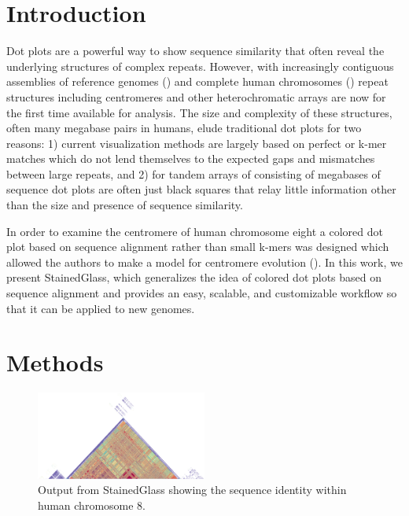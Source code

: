 \documentclass[nocrop]{bioinfo}
\begin{document}
\section{Introduction}
Dot plots are a powerful way to show sequence similarity that often reveal the
underlying structures of complex repeats. However, with increasingly contiguous
assemblies of reference genomes (\citealp{Rhie2021-zg}) and complete human
chromosomes (\citealp{Miga2020-pj,Logsdon2021-zr,Nurk2021-wb}) repeat structures
including centromeres and other heterochromatic arrays are now for the first
time available for analysis. The size and complexity of these structures, often
many megabase pairs in humans, elude traditional dot plots for two reasons: 1)
current visualization methods are largely based on perfect or k-mer matches
which do not lend themselves to the expected gaps and mismatches between large
repeats, and 2) for tandem arrays of consisting of megabases of sequence dot
plots are often just black squares that relay little information other than the
size and presence of sequence similarity. 

In order to examine the centromere of human chromosome eight a colored dot plot
based on sequence alignment rather than small k-mers was designed which allowed
the authors to make a model for centromere evolution (\citealp{Logsdon2021-zr}).
In this work, we present StainedGlass, which generalizes the idea of colored dot
plots based on sequence alignment and provides an easy, scalable, and
customizable workflow so that it can be applied to new genomes. 

\section{Methods} 
\begin{figure}[!tpb]%
\centerline{
	\includegraphics[width=0.5\textwidth,keepaspectratio]{figure1.png}
}
\caption{Output from StainedGlass showing the sequence identity within human
chromosome 8.}
\label{fig:01} 
\end{figure}
\end{document}
